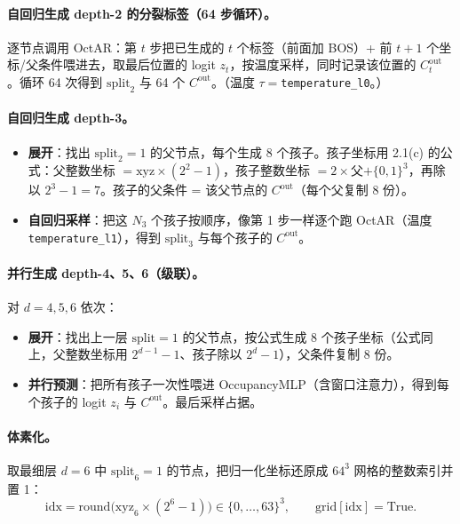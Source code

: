 \documentclass[11pt]{ctexart}
\newcommand{\code}[1]{\texttt{#1}}
\begin{document}
\paragraph{自回归生成 depth-2 的分裂标签（64 步循环）。}
逐节点调用 OctAR：第 $t$ 步把已生成的 $t$ 个标签（前面加 BOS）+ 前 $t{+}1$ 个坐标/父条件喂进去，取最后位置的 logit $z_t$，按温度采样，同时记录该位置的 $C^{\mathrm{out}}_t$。循环 64 次得到 $\mathrm{split}_2$ 与 64 个 $C^{\mathrm{out}}$。（温度 $\tau=$\code{temperature\_l0}。）

\paragraph{自回归生成 depth-3。}
\begin{itemize}[leftmargin=*]
\item \textbf{展开}：找出 $\mathrm{split}_2=1$ 的父节点，每个生成 8 个孩子。孩子坐标用 2.1(c) 的公式：父整数坐标 $=\mathrm{xyz}\times(2^2{-}1)$，孩子整数坐标 $=2\times$父$+\{0,1\}^3$，再除以 $2^3{-}1=7$。孩子的父条件 = 该父节点的 $C^{\mathrm{out}}$（每个父复制 8 份）。
\item \textbf{自回归采样}：把这 $N_3$ 个孩子按顺序，像第 1 步一样逐个跑 OctAR（温度 \code{temperature\_l1}），得到 $\mathrm{split}_3$ 与每个孩子的 $C^{\mathrm{out}}$。
\end{itemize}

\paragraph{并行生成 depth-4、5、6（级联）。} 对 $d=4,5,6$ 依次：
\begin{itemize}[leftmargin=*]
\item \textbf{展开}：找出上一层 $\mathrm{split}=1$ 的父节点，按公式生成 8 个孩子坐标（公式同上，父整数坐标用 $2^{d-1}{-}1$、孩子除以 $2^{d}{-}1$），父条件复制 8 份。
\item \textbf{并行预测}：把所有孩子一次性喂进 OccupancyMLP（含窗口注意力），得到每个孩子的 logit $z_i$ 与 $C^{\mathrm{out}}$。最后采样占据。
\end{itemize}

\paragraph{体素化。}
取最细层 $d{=}6$ 中 $\mathrm{split}_6=1$ 的节点，把归一化坐标还原成 $64^3$ 网格的整数索引并置 1：
\[
\mathrm{idx}=\mathrm{round}\big(\mathrm{xyz}_6\times(2^6-1)\big)\in\{0,\dots,63\}^3,\qquad \mathrm{grid}[\mathrm{idx}]=\mathrm{True}.
\]
\end{document}
